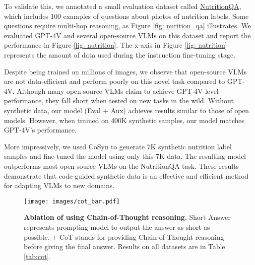 To validate this, we annotated a small 
evaluation dataset called \href{https://huggingface.co/datasets/yyupenn/NutritionQA}{NutritionQA}, which includes 100 examples of questions about photos of nutrition labels. 
Some questions require multi-hop reasoning, as Figure \ref{fig: nurition_qa} illustrates. 
We evaluated GPT-4V and several open-source VLMs on this dataset and report the performance in Figure \ref{fig: nutrition}.
The x-axis in Figure \ref{fig: nutrition} represents the amount of data used during the instruction fine-tuning stage.

Despite being trained on millions of images, we observe that open-source VLMs are not data-efficient and perform poorly on this novel task compared to GPT-4V.
Although many open-source VLMs claim to achieve GPT-4V-level performance, they fall short when tested on new tasks in the wild. 
Without synthetic data, our model (Eval + Aux) achieves results similar to those of open models. 
However, when trained on 400K synthetic samples, our model matches GPT-4V’s performance.

More impressively, we used CoSyn to generate 7K synthetic nutrition label samples and fine-tuned the model using only this 7K data. 
The resulting model outperforms most open-source VLMs on the NutritionQA task. 
These results demonstrate that code-guided synthetic data is an effective and efficient method for adapting VLMs to new domains.

\begin{figure}[!t]
    \centering
    \texttt{[image: images/cot\_bar.pdf]}
    \vspace{-.6cm}
    \caption{\textbf{Ablation of using Chain-of-Thought reasoning.} Short Answer represents prompting model to output the answer as short as possible. $+$ CoT stands for providing Chain-of-Thought reasoning before giving the final answer. Results on all datasets are in Table \ref{tab:cot}.}
    \label{fig: cot}
    \vspace{-0.2cm}
\end{figure}

